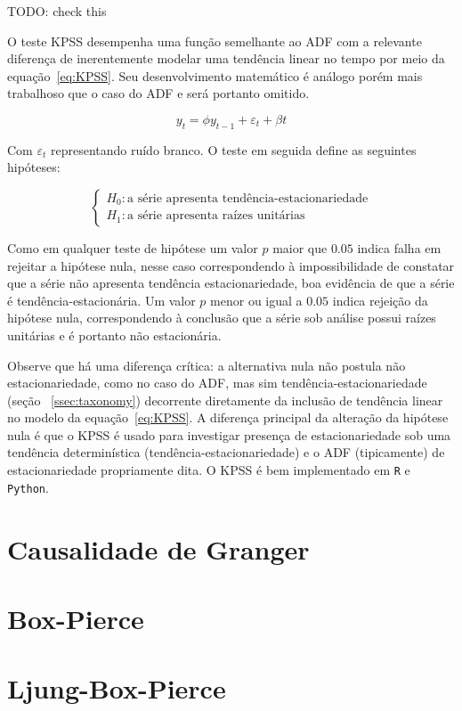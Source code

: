 TODO: check this

O teste KPSS desempenha uma função semelhante ao ADF com a relevante
diferença de inerentemente modelar uma tendência linear no tempo por meio da
equação~\ref{eq:KPSS}. Seu desenvolvimento matemático é análogo porém mais
trabalhoso que o caso do ADF e será portanto omitido.

\begin{equation}\label{eq:KPSS}
    y_t = \phi y_{t-1} + \varepsilon_t + \beta t
\end{equation}

Com $\varepsilon_t$ representando ruído branco. O teste em seguida define as
seguintes hipóteses:

$$
\begin{cases}
    H_0: \text{a série apresenta tendência-estacionariedade} \\
    H_1: \text{a série apresenta raízes unitárias}
\end{cases}
$$

Como em qualquer teste de hipótese um valor $p$ maior que $0.05$ indica falha
em rejeitar a hipótese nula, nesse caso correspondendo à impossibilidade de
constatar que a série não apresenta tendência estacionariedade, boa evidência
de que a série é tendência-estacionária. Um valor $p$ menor ou igual a $0.05$
indica rejeição da hipótese nula, correspondendo à conclusão que a série sob
análise possui raízes unitárias e é portanto não estacionária.

Observe que há uma diferença crítica: a alternativa nula não postula não
estacionariedade, como no caso do ADF, mas sim tendência-estacionariedade
(seção ~\ref{ssec:taxonomy}) decorrente diretamente da inclusão de tendência
linear no modelo da equação~\ref{eq:KPSS}. A diferença principal da alteração
da hipótese nula é que o KPSS é usado para investigar presença de
estacionariedade sob uma tendência determinística (tendência-estacionariedade)
e o ADF (tipicamente) de estacionariedade propriamente dita. O KPSS é bem
implementado em \verb+R+ e \verb+Python+.

\section{Causalidade de Granger}

\section{Box-Pierce}

\section{Ljung-Box-Pierce}

